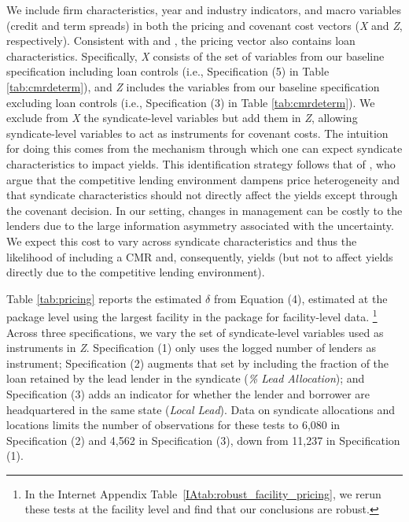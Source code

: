 \documentclass[a4paper,12pt]{article}
\begin{document}
We include firm characteristics, year and industry indicators, and macro variables (credit and term spreads) in both the pricing and covenant cost vectors (\textit{X} and \textit{Z}, respectively).
Consistent with \cite{Goyal_2005} and \cite{Miller_2012}, the pricing vector also contains loan characteristics. 
Specifically, \textit{X} consists of the set of variables from our baseline specification including loan controls (i.e., Specification (5) in Table \ref{tab:cmrdeterm}), and \textit{Z} includes the variables from our baseline specification excluding loan controls (i.e., Specification (3) in Table \ref{tab:cmrdeterm}).
We exclude from \textit{X} the syndicate-level variables but add them in \textit{Z}, allowing syndicate-level variables to act as instruments for covenant costs.
The intuition for doing this comes from the mechanism through which one can expect syndicate characteristics to impact yields.
This identification strategy follows that of \cite{Bradley_2015}, who argue that the competitive lending environment dampens price heterogeneity and that syndicate characteristics should not directly affect the yields except through the covenant decision.
In our setting, changes in management can be costly to the lenders due to the large information asymmetry associated with the uncertainty.
We expect this cost to vary across syndicate characteristics and thus the likelihood of including a CMR and, consequently, yields (but not to affect yields directly due to the competitive lending environment).



Table \ref{tab:pricing} reports the estimated $\delta$ from Equation (4), estimated at the package level using the largest facility in the package for facility-level data.%
    \footnote{In the Internet Appendix Table~\ref{IAtab:robust_facility_pricing}, we rerun these tests at the facility level and find that our conclusions are robust.}
Across three specifications, we vary the set of syndicate-level variables used as instruments in \textit{Z}.
Specification (1) only uses the logged number of lenders as instrument; Specification (2) augments that set by including the fraction of the loan retained by the lead lender in the syndicate (\textit{\% Lead Allocation}); and Specification (3) adds an indicator for whether the lender and borrower are headquartered in the same state (\textit{Local Lead}). 
Data on syndicate allocations and locations limits the number of observations for these tests to 6,080 in Specification (2) and 4,562 in Specification (3), down from 11,237 in Specification (1).
\end{document}
